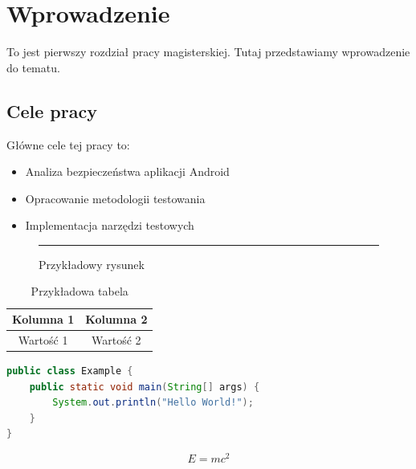 \documentclass{ppfcmthesis}
\begin{document}
\maketitle

\tableofcontents
\newpage
\listoffigures
\newpage
\listoftables
\newpage
\lstlistoflistings

\chapter{Wprowadzenie}

To jest pierwszy rozdział pracy magisterskiej. Tutaj przedstawiamy wprowadzenie do tematu.

\section{Cele pracy}

Główne cele tej pracy to:
\begin{itemize}
\item Analiza bezpieczeństwa aplikacji Android
\item Opracowanie metodologii testowania
\item Implementacja narzędzi testowych
\end{itemize}

\begin{figure}[h]
\centering
\rule{5cm}{3cm}
\caption{Przykładowy rysunek}
\label{fig:przyklad}
\end{figure}

\begin{table}[h]
\centering
\begin{tabular}{|c|c|}
\hline
Kolumna 1 & Kolumna 2 \\
\hline
Wartość 1 & Wartość 2 \\
\hline
\end{tabular}
\caption{Przykładowa tabela}
\label{tab:przyklad}
\end{table}

\begin{lstlisting}[language=Java, caption=Przykładowy kod Java]
public class Example {
    public static void main(String[] args) {
        System.out.println("Hello World!");
    }
}
\end{lstlisting}

\begin{equation}
E = mc^2
\label{eq:einstein}
\end{equation}
\end{document}
